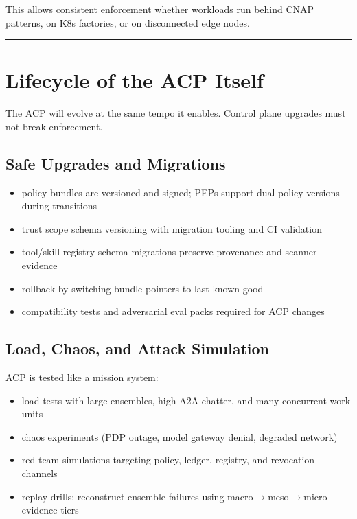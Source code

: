 \documentclass[11pt]{article}
\begin{document}
This allows consistent enforcement whether workloads run behind CNAP
patterns, on K8s factories, or on disconnected edge nodes.

\vspace{2pt}\begin{center}\rule{0.62\linewidth}{0.6pt}\end{center}\vspace{2pt}

\hypertarget{lifecycle-of-the-acp-itself}{%
\section{Lifecycle of the ACP Itself}\label{lifecycle-of-the-acp-itself}}

The ACP will evolve at the same tempo it enables. Control plane upgrades
must not break enforcement.

\hypertarget{safe-upgrades-and-migrations}{%
\subsection{Safe Upgrades and Migrations}\label{safe-upgrades-and-migrations}}

\begin{itemize}
\tightlist
\item
  policy bundles are versioned and signed; PEPs support dual policy
  versions during transitions
\item
  trust scope schema versioning with migration tooling and CI validation
\item
  tool/skill registry schema migrations preserve provenance and scanner
  evidence
\item
  rollback by switching bundle pointers to last-known-good
\item
  compatibility tests and adversarial eval packs required for ACP
  changes
\end{itemize}

\hypertarget{load-chaos-and-attack-simulation}{%
\subsection{Load, Chaos, and Attack Simulation}\label{load-chaos-and-attack-simulation}}

ACP is tested like a mission system:

\begin{itemize}
\tightlist
\item
  load tests with large ensembles, high A2A chatter, and many concurrent
  work units
\item
  chaos experiments (PDP outage, model gateway denial, degraded network)
\item
  red-team simulations targeting policy, ledger, registry, and
  revocation channels
\item
  replay drills: reconstruct ensemble failures using macro\ensuremath{\rightarrow}meso\ensuremath{\rightarrow}micro
  evidence tiers
\end{itemize}
\end{document}
